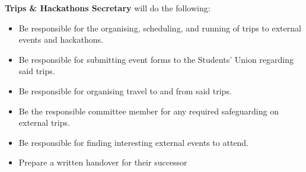 \begin{subclause}
    \textbf{Trips \& Hackathons Secretary} will do the following: 
    \begin{itemize}[label=--,topsep=0em,itemsep=0em]
      \item Be responsible for the organising, scheduling, and running of trips to external events and hackathons.
      \item Be responsible for submitting event forms to the Students' Union regarding said trips.
      \item Be responsible for organising travel to and from said trips.
      \item Be the responsible committee member for any required safeguarding on external trips.
      \item Be responsible for finding interesting external events to attend.
      \item Prepare a written handover for their successor
    \end{itemize}
  \end{subclause}
  
